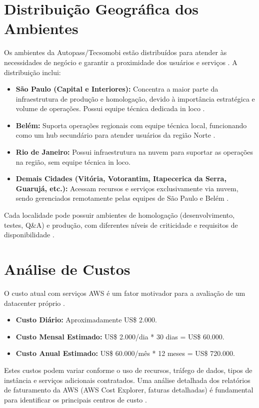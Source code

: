 \documentclass[
	12pt,				%
	oneside,			%
	a4paper,			%
	english,			%
	brazil				%
	]{abntex2unama}
\begin{document}
\section{Distribuição Geográfica dos Ambientes}
Os ambientes da Autopass/Tecsomobi estão distribuídos para atender às necessidades de negócio e garantir a proximidade dos usuários e serviços \cite{modular_datacenters}. A distribuição inclui:
\begin{itemize}
	\item \textbf{São Paulo (Capital e Interiores):} Concentra a maior parte da infraestrutura de produção e homologação, devido à importância estratégica e volume de operações. Possui equipe técnica dedicada in loco \cite{hyperscale_datacenters}.
	\item \textbf{Belém:} Suporta operações regionais com equipe técnica local, funcionando como um hub secundário para atender usuários da região Norte \cite{edge_computing}.
	\item \textbf{Rio de Janeiro:} Possui infraestrutura na nuvem para suportar as operações na região, sem equipe técnica in loco.
	\item \textbf{Demais Cidades (Vitória, Votorantim, Itapecerica da Serra, Guarujá, etc.):} Acessam recursos e serviços exclusivamente via nuvem, sendo gerenciados remotamente pelas equipes de São Paulo e Belém \cite{datacenter_monitoring}.
\end{itemize}
Cada localidade pode possuir ambientes de homologação (desenvolvimento, testes, Q\&A) e produção, com diferentes níveis de criticidade e requisitos de disponibilidade \cite{reliability_engineering}.

\section{Análise de Custos}
O custo atual com serviços AWS é um fator motivador para a avaliação de um datacenter próprio \cite{dcim_evolution}.
\begin{itemize}
	\item \textbf{Custo Diário:} Aproximadamente US\$ 2.000.
	\item \textbf{Custo Mensal Estimado:} US\$ 2.000/dia * 30 dias = US\$ 60.000.
	\item \textbf{Custo Anual Estimado:} US\$ 60.000/mês * 12 meses = US\$ 720.000.
\end{itemize}
Estes custos podem variar conforme o uso de recursos, tráfego de dados, tipos de instância e serviços adicionais contratados. Uma análise detalhada dos relatórios de faturamento da AWS (AWS Cost Explorer, faturas detalhadas) é fundamental para identificar os principais centros de custo \cite{capacity_planning}.
\end{document}
